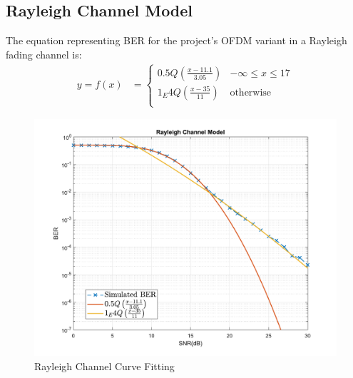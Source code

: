 \subsection{Rayleigh Channel Model}
The equation representing BER for the project's OFDM variant in a Rayleigh fading channel is:
\begin{align}
	y = f(x) &=
	\begin{cases}
		0.5Q \left(\frac{x - 11.1}{3.05}\right) & -\infty \leq x \leq 17 \\
		1_E4Q \left(\frac{x - 35}{11}\right) & \text{otherwise} \\
	\end{cases}
\end{align}
\begin{figure}[htpb!]
    \centering
    \includegraphics[scale=0.6]{Graphics/Methodology/RaylCurveFit.pdf}
    \caption{Rayleigh Channel Curve Fitting}
	\label{fig:raylCurveFit}
\end{figure}
\pagebreak

